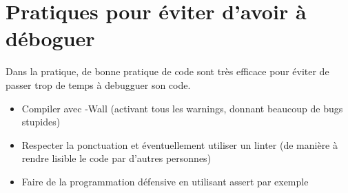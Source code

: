 \section{Pratiques pour éviter d'avoir à déboguer}


Dans la pratique, de bonne pratique de code sont très efficace pour éviter de passer trop de temps à debugguer son code.

\begin{itemize}[label=$\star$]
	\item Compiler avec -Wall (activant tous les warnings, donnant beaucoup de bugs stupides)

	\item Respecter la ponctuation et éventuellement utiliser un linter (de manière à rendre lisible le code par d'autres personnes)

	\item Faire de la programmation défensive en utilisant assert par exemple
\end{itemize}

